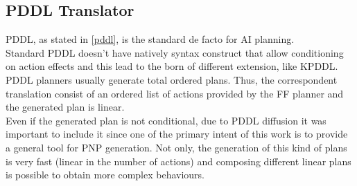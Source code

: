 \documentclass[pdftex,12pt,a4paper]{report}
\begin{document}
\subsection{PDDL Translator}
PDDL, as stated in \ref{pddl}, is the standard de facto for AI planning. \\
Standard PDDL doesn't have natively syntax construct that allow conditioning on action effects and this lead to the born of different extension, like KPDDL.\\
PDDL planners usually generate total ordered plans. Thus, the correspondent translation consist of an ordered list of actions provided by the FF planner and the generated plan is linear.
\newline 
{}\\
\newline
Even if the generated plan is not conditional, due to PDDL diffusion it was important to include it since one of the primary intent of this work is to provide a general tool for PNP generation. Not only, the generation of this kind of plans is very fast (linear in the number of actions) and composing different linear plans is possible to obtain more complex behaviours.

\newpage
\end{document}
